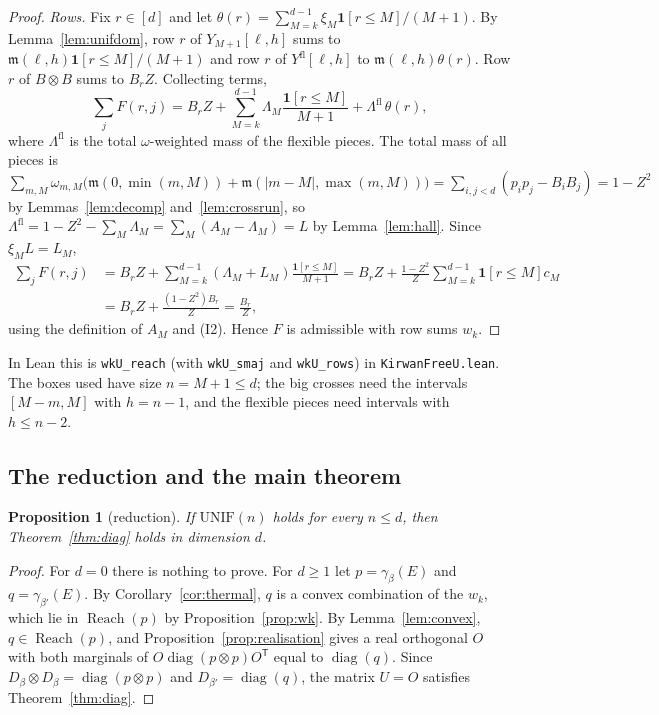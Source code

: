 \documentclass[11pt]{amsart}
\newtheorem{proposition}[lemma]{Proposition}
\theoremstyle{definition}
\theoremstyle{remark}
\numberwithin{equation}{section}
\newcommand{\diag}{\operatorname{diag}}
\newcommand{\Reach}{\operatorname{Reach}}
\newcommand{\ind}[1]{\mathbf{1}[#1]}
\newcommand{\ms}{\mathfrak{m}}
\newcommand{\lean}[1]{\texttt{#1}}
\begin{document}
\begin{proof}
\emph{Rows.} Fix $r\in[d]$ and let $\theta(r)=\sum_{M=k}^{d-1}\xi_M\ind{r\le M}/(M+1)$. By
Lemma~\ref{lem:unifdom}, row $r$ of $Y_{M+1}[\ell,h]$ sums to $\ms(\ell,h)\ind{r\le M}/(M+1)$ and row
$r$ of $Y^{\mathrm{fl}}[\ell,h]$ to $\ms(\ell,h)\theta(r)$. Row $r$ of $B\otimes B$ sums to $B_rZ$.
Collecting terms,
\[
  \sum_jF(r,j)=B_rZ+\sum_{M=k}^{d-1}\Lambda_M\frac{\ind{r\le M}}{M+1}+\Lambda^{\mathrm{fl}}\,\theta(r),
\]
where $\Lambda^{\mathrm{fl}}$ is the total $\omega$-weighted mass of the flexible pieces. The total mass
of all pieces is
$\sum_{m,M}\omega_{m,M}\bigl(\ms(0,\min(m,M))+\ms(|m-M|,\max(m,M))\bigr)=\sum_{i,j<d}(p_ip_j-B_iB_j)=1-Z^2$ by
Lemmas~\ref{lem:decomp} and~\ref{lem:crossrun}, so
$\Lambda^{\mathrm{fl}}=1-Z^2-\sum_M\Lambda_M=\sum_M(A_M-\Lambda_M)=L$ by Lemma~\ref{lem:hall}. Since
$\xi_ML=L_M$,
\begin{align*}
  \sum_jF(r,j)&=B_rZ+\sum_{M=k}^{d-1}(\Lambda_M+L_M)\frac{\ind{r\le M}}{M+1}
  =B_rZ+\frac{1-Z^2}{Z}\sum_{M=k}^{d-1}\ind{r\le M}c_M\\
  &=B_rZ+\frac{(1-Z^2)B_r}{Z}=\frac{B_r}{Z},
\end{align*}
using the definition of $A_M$ and (I2). Hence $F$ is admissible with row sums $w_k$.
\end{proof}

In Lean this is \lean{wkU\_reach} (with \lean{wkU\_smaj} and \lean{wkU\_rows}) in
\lean{KirwanFreeU.lean}. The boxes used have size $n=M+1\le d$; the big crosses need the intervals
$[M-m,M]$ with $h=n-1$, and the flexible pieces need intervals with $h\le n-2$.

\subsection{The reduction and the main theorem}

\begin{proposition}[reduction]\label{prop:reduction}
If $\mathrm{UNIF}(n)$ holds for every $n\le d$, then Theorem~\ref{thm:diag} holds in dimension $d$.
\end{proposition}

\begin{proof}
For $d=0$ there is nothing to prove. For $d\ge1$ let $p=\gamma_\beta(E)$ and $q=\gamma_{\beta'}(E)$. By
Corollary~\ref{cor:thermal}, $q$ is a convex combination of the $w_k$, which lie in $\Reach(p)$ by
Proposition~\ref{prop:wk}. By Lemma~\ref{lem:convex}, $q\in\Reach(p)$, and
Proposition~\ref{prop:realisation} gives a real orthogonal $O$ with both marginals of
$O\diag(p\otimes p)O^{\mathsf T}$ equal to $\diag(q)$. Since $D_\beta\otimes D_\beta=\diag(p\otimes p)$
and $D_{\beta'}=\diag(q)$, the matrix $U=O$ satisfies Theorem~\ref{thm:diag}.
\end{proof}
\end{document}
